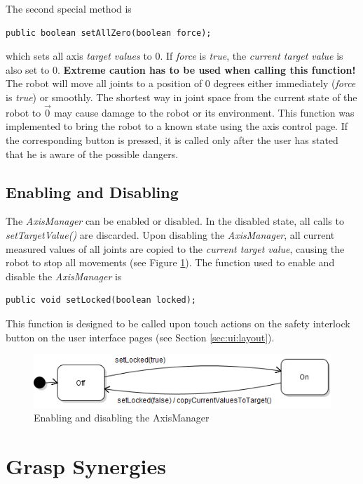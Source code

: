 The second special method is
\begin{lstlisting}
public boolean setAllZero(boolean force);
\end{lstlisting}
which sets all axis \textit{target values} to 0. If \textit{force} is \textit{true}, the \textit{current target value} is also set to 0. \textbf{Extreme caution has to be used when calling this function!} The robot will move all joints to a position of 0 degrees either immediately (\textit{force} is \textit{true}) or smoothly. The shortest way in joint space from the current state of the robot to $\vec{0}$ may cause damage to the robot or its environment. This function was implemented to bring the robot to a known state using the axis control page. If the corresponding button is pressed, it is called only after the user has stated that he is aware of the possible dangers.

\subsection{Enabling and Disabling}

The \textit{AxisManager} can be enabled or disabled. In the disabled state, all calls to \textit{setTargetValue()} are discarded. Upon disabling the \textit{AxisManager}, all current measured values of all joints are copied to the \textit{current target value}, causing the robot to stop all movements (see Figure \ref{fig:impl:axisonoff}). The function used to enable and disable the \textit{AxisManager} is
\begin{lstlisting}
public void setLocked(boolean locked);
\end{lstlisting}

This function is designed to be called upon touch actions on the safety interlock button on the user interface pages (see Section \ref{sec:ui:layout}).

\begin{figure}
	\caption{\label{fig:impl:axisonoff}Enabling and disabling the AxisManager}
	\includegraphics[width=0.75\linewidth]{assets/chpt_impl/sw/AxisManager_onoff}
\end{figure}

\section{Grasp Synergies}

